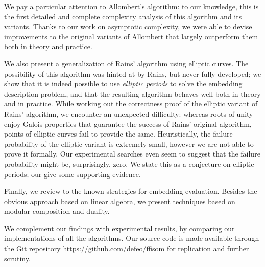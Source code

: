 \documentclass{article}
\begin{document}
We pay a particular attention to Allombert's algorithm:
to our knowledge, this is the first detailed and complete complexity
analysis of this algorithm and its variants. %
Thanks to our work on asymptotic complexity, we were able to devise
improvements to the original variants of Allombert that largely
outperform them both in theory and practice. %

We also present a generalization of Rains' algorithm using elliptic
curves. %
The possibility of this algorithm was hinted at by Rains, but never
fully developed; we show that it is indeed possible to use
\emph{elliptic periods} to solve the embedding description problem,
and that the resulting algorithm behaves well both in theory and in
practice. %
While working out the correctness proof of the elliptic variant of
Rains' algorithm, we encounter an unexpected difficulty: whereas roots
of unity enjoy Galois properties that guarantee the success of Rains'
original algorithm, points of elliptic curves fail to provide the
same. %
Heuristically, the failure probability of the elliptic variant is
extremely small, however we are not able to prove it formally. %
Our experimental searches even seem to suggest that the failure
probability might be, surprisingly, zero. %
We state this as a conjecture on elliptic periods; our give some
supporting evidence.

Finally, we review to the known strategies for embedding
evaluation. Besides the obvious approach based on linear algebra, we
present techniques based on modular composition and duality.

We complement our findings with experimental results, by comparing our
implementations of all the algorithms. Our source code is made
available through the Git repository
\url{https://github.com/defeo/ffisom} for replication and further
scrutiny.



\end{document}
